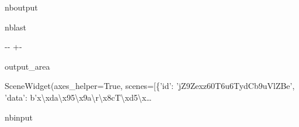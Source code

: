 \documentclass[letterpaper,10pt,english]{sphinxmanual}
\begin{document}
\begin{sphinxuseclass}{nboutput}
\begin{sphinxuseclass}{nblast}
{

\kern-\sphinxverbatimsmallskipamount\kern-\baselineskip
\kern+\FrameHeightAdjust\kern-\fboxrule
\vspace{\nbsphinxcodecellspacing}

\begin{sphinxuseclass}{output_area}
\begin{sphinxuseclass}{}


\begin{sphinxVerbatim}[commandchars=\\\{\}]
\llap{\color{nbsphinxout}[11]:\,\hspace{\fboxrule}\hspace{\fboxsep}}SceneWidget(axes\_helper=True, scenes=[\{'id': 'jZ9Zexz60T6u6TydCb9uVlZBe', 'data': b'x\textbackslash{}xda\textbackslash{}x95\textbackslash{}x9a\textbackslash{}r\textbackslash{}x8cT\textbackslash{}xd5\textbackslash{}x…
\end{sphinxVerbatim}



\end{sphinxuseclass}
\end{sphinxuseclass}
}

\end{sphinxuseclass}
\end{sphinxuseclass}
\begin{sphinxuseclass}{nbinput}
{
\begin{sphinxVerbatim}[commandchars=\\\{\}]
\llap{\color{nbsphinxin}[32]:\,\hspace{\fboxrule}\hspace{\fboxsep}}  
              
             
              
\end{sphinxVerbatim}
}

\end{sphinxuseclass}
\end{document}
